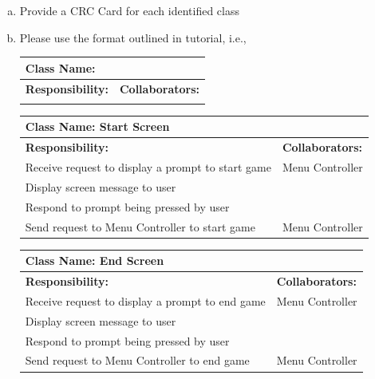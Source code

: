 \documentclass[12pt, titlepage]{article}
\begin{document}
\begin{enumerate}[a)]
	\item Provide a CRC Card for each identified class
	\item Please use the format outlined in tutorial, i.e., 
	\begin{table}[ht]
		\centering
		\begin{tabular}{|p{5cm}|p{5cm}|}
		\hline 
		 \multicolumn{2}{|l|}{\textbf{Class Name:}} \\
		\hline
		\textbf{Responsibility:} & \textbf{Collaborators:} \\
		\hline
		\vspace{1in} & \\
		\hline
		\end{tabular}
	\end{table}

	\begin{table}[H]
		\centering
		\begin{tabular}{|p{5cm}|p{5cm}|}
		\hline 
		 \multicolumn{2}{|l|}{\textbf{Class Name: Start Screen}} \\
		\hline
		\textbf{Responsibility:} & \textbf{Collaborators:} \\
		\hline
		 Receive request to display a prompt to start game& Menu Controller \\
		 Display screen message to user& \\
		 Respond to prompt being pressed by user& \\
		 Send request to Menu Controller to start game& Menu Controller \\
		\hline
		\end{tabular}
	\end{table}
	
	\begin{table}[H]
		\centering
		\begin{tabular}{|p{5cm}|p{5cm}|}
		\hline 
		 \multicolumn{2}{|l|}{\textbf{Class Name: End Screen}} \\
		\hline
		\textbf{Responsibility:} & \textbf{Collaborators:} \\
		\hline
		 Receive request to display a prompt to end game& Menu Controller \\
		 Display screen message to user& \\
		 Respond to prompt being pressed by user& \\
		 Send request to Menu Controller to end game& Menu Controller \\
		\hline
		\end{tabular}
	\end{table}
	

\end{enumerate}
\end{document}
